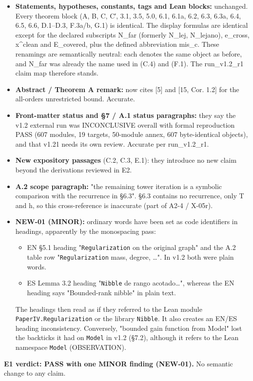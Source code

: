 \documentclass[
]{article}
\providecommand{\tightlist}{%
  \setlength{\itemsep}{0pt}\setlength{\parskip}{0pt}}
\begin{document}
\begin{itemize}
\item
  \textbf{Statements, hypotheses, constants, tags and Lean blocks:}
  unchanged. Every theorem block (A, B, C, C′, 3.1, 3.5, 5.0, 6.1, 6.1a,
  6.2, 6.3, 6.3a, 6.4, 6.5, 6.6, D.1--D.3, F.3a/b, G.1) is identical.
  The display formulas are identical except for the declared subscripts
  N\_far (formerly N\_lej, N\_lejano), e\_cross, x\^{}clean and
  E\_covered, plus the defined abbreviation mis\_c. These renamings are
  semantically neutral: each denotes the same object as before, and
  N\_far was already the name used in (C.4) and (F.1). The run\_v1.2\_r1
  claim map therefore stands.
\item
  \textbf{Abstract / Theorem A remark:} now cites {[}5{]} and {[}15,
  Cor. 1.2{]} for the all-orders unrestricted bound. Accurate.
\item
  \textbf{Front-matter status and §7 / A.1 status paragraphs:} they say
  the v1.2 external run was INCONCLUSIVE overall with formal
  reproduction PASS (607 modules, 19 targets, 50-module annex, 607
  byte-identical objects), and that v1.21 needs its own review. Accurate
  per run\_v1.2\_r1.
\item
  \textbf{New expository passages} (C.2, C.3, E.1): they introduce no
  new claim beyond the derivations reviewed in E2.
\item
  \textbf{A.2 scope paragraph:} "the remaining tower iteration is a
  symbolic comparison with the recurrence in §6.3". §6.3 contains no
  recurrence, only T and h, so this cross-reference is inaccurate (part
  of A2-4 / X-05r).
\item
  \textbf{NEW-01 (MINOR):} ordinary words have been set as code
  identifiers in headings, apparently by the monospacing pass:

  \begin{itemize}
  \tightlist
  \item
    EN §5.1 heading "\texttt{Regularization} on the original graph" and
    the A.2 table row "\texttt{Regularization} mass, degree, \ldots". In
    v1.2 both were plain words.
  \item
    ES Lemma 3.2 heading "\texttt{Nibble} de rango acotado\ldots",
    whereas the EN heading says "Bounded-rank nibble" in plain text.
  \end{itemize}

  The headings then read as if they referred to the Lean module
  \texttt{PaperIV.Regularization} or the library \texttt{Nibble}. It
  also creates an EN/ES heading inconsistency. Conversely, "bounded gain
  function from Model" lost the backticks it had on \texttt{Model} in
  v1.2 (§7.2), although it refers to the Lean namespace \texttt{Model}
  (OBSERVATION).
\end{itemize}

\textbf{E1 verdict: PASS with one MINOR finding (NEW-01).} No semantic
change to any claim.
\end{document}
